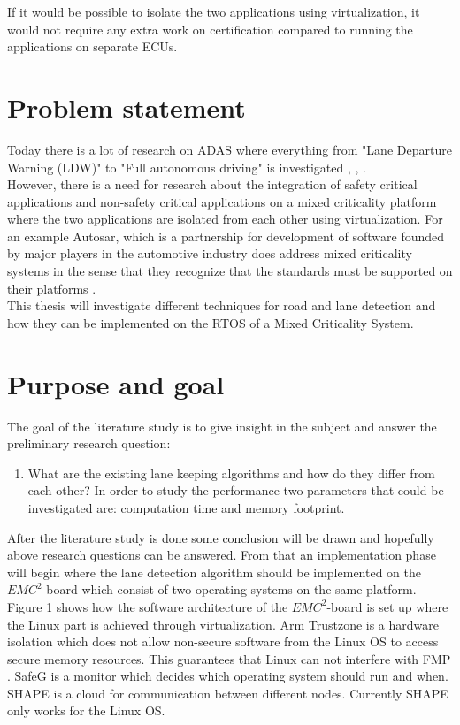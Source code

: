 If it would be possible to isolate the two applications using virtualization, it would not require any extra work on certification compared to running the applications on separate ECUs.

\section{Problem statement}
Today there is a lot of research on ADAS where everything from "Lane Departure Warning (LDW)" to "Full autonomous driving" is investigated \cite{BarHillel2014}, \cite{Yenikaya:2013:KVR:2522968.2522970}, \cite{mccall2006video}.\\

However, there is a need for research about the integration of safety critical applications and non-safety critical applications on a mixed criticality platform where the two applications are isolated from each other using virtualization. For an example Autosar, which is a partnership for development of software founded by major players in the automotive industry does address mixed criticality systems in the sense that they recognize that the standards must be supported on their platforms \cite{burns2013mixed} \cite{auto}.\\

This thesis will investigate different techniques for road and lane detection and how they can be implemented on the RTOS of a Mixed Criticality System. 


\section{Purpose and goal}
The goal of the literature study is to give insight in the subject and answer the preliminary research question:
\begin{enumerate}  
\item What are the existing lane keeping algorithms and how do they differ from each other? In order to study the performance two parameters that could be investigated are: computation time and memory footprint.
\end{enumerate}

After the literature study is done some conclusion will be drawn and hopefully above research questions can be answered. From that an implementation phase will begin where the lane detection algorithm should be implemented on the $EMC^2$-board which consist of two operating systems on the same platform. Figure 1 shows how the software architecture of the $EMC^2$-board is set up where the Linux part is achieved through virtualization. Arm Trustzone is a hardware isolation which does not allow non-secure software from the Linux OS to access secure memory resources. This guarantees that Linux can not interfere with FMP \cite{zaki2016}. SafeG is a monitor which decides which operating system should run and when. SHAPE is a cloud for communication between different nodes. Currently SHAPE only works for the Linux OS.


